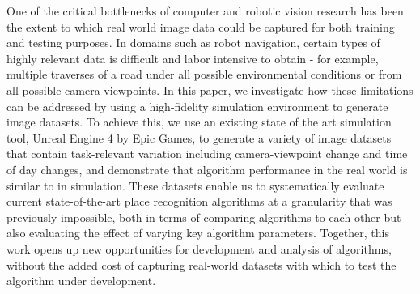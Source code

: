 
One of the critical bottlenecks of computer and robotic vision research has been the extent to which real world image data could be captured for both training and testing purposes. In domains such as robot navigation, certain types of highly relevant data is difficult and labor intensive to obtain - for example, multiple traverses of a road under all possible environmental conditions or from all possible camera viewpoints. In this paper, we investigate how these limitations can be addressed by using a high-fidelity simulation environment to generate image datasets. To achieve this, we use an existing state of the art simulation tool, Unreal Engine 4 by Epic Games, to generate a variety of image datasets that contain task-relevant variation including camera-viewpoint change and time of day changes, and demonstrate that algorithm performance in the real world is similar to in simulation. These datasets enable us to systematically evaluate current state-of-the-art place recognition algorithms at a granularity that was previously impossible, both in terms of comparing algorithms to each other but also evaluating the effect of varying key algorithm parameters. Together, this work opens up new opportunities for development and analysis of algorithms, without the added cost of capturing real-world datasets with which to test the algorithm under development.